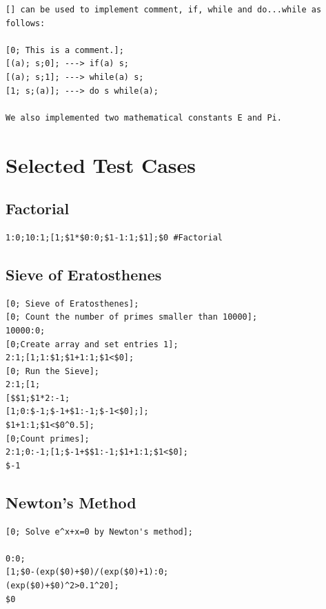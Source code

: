 \documentclass[]{article}
\begin{document}
\begin{appendices}
\begin{lstlisting}
[] can be used to implement comment, if, while and do...while as follows: 
	
[0; This is a comment.];
[(a); s;0]; ---> if(a) s;
[(a); s;1]; ---> while(a) s;
[1; s;(a)]; ---> do s while(a);
	
We also implemented two mathematical constants E and Pi.
\end{lstlisting}

\section{Selected Test Cases}
\subsection{Factorial}
\begin{lstlisting}
1:0;10:1;[1;$1*$0:0;$1-1:1;$1];$0 #Factorial
\end{lstlisting}	
\subsection{Sieve of Eratosthenes}
\begin{lstlisting}
[0; Sieve of Eratosthenes];
[0; Count the number of primes smaller than 10000];
10000:0;
[0;Create array and set entries 1];
2:1;[1;1:$1;$1+1:1;$1<$0]; 
[0; Run the Sieve];
2:1;[1;
[$$1;$1*2:-1;
[1;0:$-1;$-1+$1:-1;$-1<$0];];
$1+1:1;$1<$0^0.5];
[0;Count primes];
2:1;0:-1;[1;$-1+$$1:-1;$1+1:1;$1<$0];
$-1
\end{lstlisting}
\subsection{Newton's Method}
\begin{lstlisting}
[0; Solve e^x+x=0 by Newton's method];

0:0;
[1;$0-(exp($0)+$0)/(exp($0)+1):0;
(exp($0)+$0)^2>0.1^20];
$0
\end{lstlisting}
\end{appendices}
\end{document}
